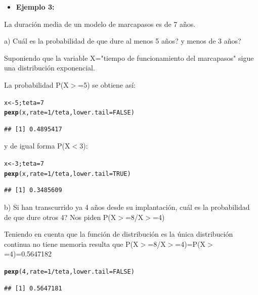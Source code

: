 \documentclass[12pt,letterpaper]{article}\usepackage[]{graphicx}\usepackage[]{color}
\makeatletter
\newcommand{\hlnum}[1]{\textcolor[rgb]{0.686,0.059,0.569}{#1}}%
\newcommand{\hlopt}[1]{\textcolor[rgb]{0,0,0}{#1}}%
\newcommand{\hlstd}[1]{\textcolor[rgb]{0.345,0.345,0.345}{#1}}%
\newcommand{\hlkwb}[1]{\textcolor[rgb]{0.69,0.353,0.396}{#1}}%
\newcommand{\hlkwc}[1]{\textcolor[rgb]{0.333,0.667,0.333}{#1}}%
\newcommand{\hlkwd}[1]{\textcolor[rgb]{0.737,0.353,0.396}{\textbf{#1}}}%
\newenvironment{kframe}{%
 \def\at@end@of@kframe{}%
 \ifinner\ifhmode%
  \def\at@end@of@kframe{\end{minipage}}%
  \begin{minipage}{\columnwidth}%
 \fi\fi%
 \def\FrameCommand##1{\hskip\@totalleftmargin \hskip-\fboxsep
 \colorbox{shadecolor}{##1}\hskip-\fboxsep
     \hskip-\linewidth \hskip-\@totalleftmargin \hskip\columnwidth}%
 \MakeFramed {\advance\hsize-\width
   \@totalleftmargin\z@ \linewidth\hsize
   \@setminipage}}%
 {\par\unskip\endMakeFramed%
 \at@end@of@kframe}
\newenvironment{knitrout}{}{} %
\makeatother
\begin{document}
\begin{itemize}
  \item \textbf{Ejemplo 3:}
\end{itemize}
La duraci\'on media de un modelo de marcapasos es de 7 a\~nos. 
\begin{description}
  \item a) \¿Cu\'al es la probabilidad de que dure al menos 5 a\~nos? \¿y menos de 3 a\~nos?
  
Suponiendo que la variable X="tiempo de funcionamiento del marcapasos" sigue una distribuci\'on exponencial.

La probabilidad P(X$>$=5) se obtiene as\'i:
\begin{knitrout}
\color{fgcolor}\begin{kframe}
\begin{alltt}
\hlstd{x} \hlkwb{<-} \hlnum{5}\hlstd{; teta}\hlkwb{=}\hlnum{7}
\hlkwd{pexp}\hlstd{(x,} \hlkwc{rate}\hlstd{=}\hlnum{1}\hlopt{/}\hlstd{teta,} \hlkwc{lower.tail}\hlstd{=}\hlnum{FALSE}\hlstd{)}
\end{alltt}
\begin{verbatim}
## [1] 0.4895417
\end{verbatim}
\end{kframe}
\end{knitrout}

y de igual forma  P(X$<$3): 
\begin{knitrout}
\color{fgcolor}\begin{kframe}
\begin{alltt}
\hlstd{x} \hlkwb{<-} \hlnum{3}\hlstd{; teta}\hlkwb{=}\hlnum{7}
\hlkwd{pexp}\hlstd{(x,} \hlkwc{rate}\hlstd{=}\hlnum{1}\hlopt{/}\hlstd{teta,} \hlkwc{lower.tail}\hlstd{=}\hlnum{TRUE}\hlstd{)}
\end{alltt}
\begin{verbatim}
## [1] 0.3485609
\end{verbatim}
\end{kframe}
\end{knitrout}


  \item b) Si han transcurrido ya 4 a\~nos desde su implantaci\'on, \¿cu\'al es la probabilidad de que dure otros 4? Nos piden P(X$>$=8/X$>$=4)
  
Teniendo en cuenta que la funci\'on de distribuci\'on es la \'unica distribuci\'on continua no tiene memoria resulta que P(X$>$=8/X$>$=4)=P(X$>$=4)=0.5647182
\begin{knitrout}
\color{fgcolor}\begin{kframe}
\begin{alltt}
\hlkwd{pexp}\hlstd{(}\hlnum{4}\hlstd{,} \hlkwc{rate}\hlstd{=}\hlnum{1}\hlopt{/}\hlstd{teta,} \hlkwc{lower.tail}\hlstd{=}\hlnum{FALSE}\hlstd{)}
\end{alltt}
\begin{verbatim}
## [1] 0.5647181
\end{verbatim}
\end{kframe}
\end{knitrout}


\end{description}
\end{document}

